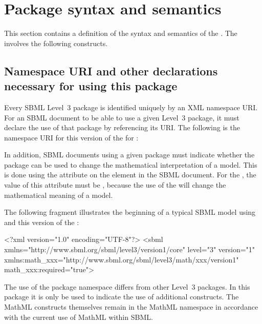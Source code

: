 
\section{Package syntax and semantics}
\label{sec:syntax}

This section contains a definition of the syntax and semantics of the \sbmlthreepkg.  The \ThisPackage involves the following \mathmltwo \cite{w3c:2000b} constructs.


\subsection{Namespace URI and other declarations necessary for using this package}
\label{xml-namespace}

Every SBML Level~3 package is identified uniquely by an XML namespace URI.  For an SBML document to be able to use a given Level~3 package, it must declare the use of that package by referencing its URI.  The following is the namespace URI for this version of the \ThisPackage for \sbmlthreecorenoversion:
\begin{center}
\PackageURL
\end{center}

In addition, SBML documents using a given package must indicate whether the package can be used to change the mathematical interpretation of a model.  This is done using the attribute  on the  element in the SBML document.  For the \ThisPackage, the value of this attribute must be , because the use of the \ThisPackage will change the mathematical meaning of a model.

The following fragment illustrates the beginning of a typical SBML model using \sbmlthreecore and this version of the \ThisPackage:


\begin{example}
<?xml version="1.0" encoding="UTF-8"?>
<sbml xmlns="http://www.sbml.org/sbml/level3/version1/core" level="3" version="1"
      xmlns:math_xxx="http://www.sbml.org/sbml/level3/math/xxx/version1"
      math_xxx:required="true">
\end{example}

The use of the package namespace differs from other Level~3 packages. In this package it is only be used to indicate the use of additional constructs. The MathML constructs themselves remain in the MathML namespace in accordance with the current use of MathML within SBML. 


